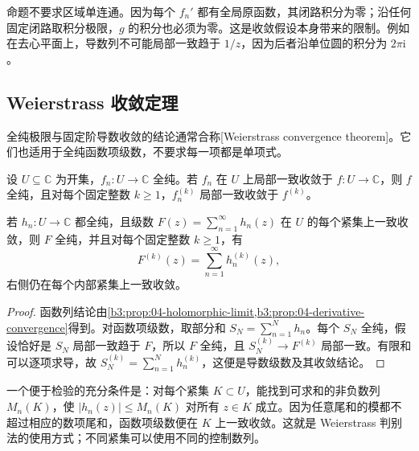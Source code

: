 \ProseParagraphBreak

命题不要求区域单连通。因为每个 \(f_n'\) 都有全局原函数，其闭路积分为零；沿任何固定闭路取积分极限，\(g\) 的积分也必须为零。这是收敛假设本身带来的限制。例如在去心平面上，导数列不可能局部一致趋于 \(1/z\)，因为后者沿单位圆的积分为 \(2\pi\mathrm{i}\)。

\subsection{Weierstrass 收敛定理}
\label{b3:subsec:040104}

全纯极限与固定阶导数收敛的结论通常合称[Weierstrass convergence theorem]。它们也适用于全纯函数项级数，不要求每一项都是单项式。
\begin{theorem}[Weierstrass]\label{b3:thm:04-weierstrass}
设 \(U\subseteq\mathbb C\) 为开集，\(f_n:U\to\mathbb C\) 全纯。若 \(f_n\) 在 \(U\) 上局部一致收敛于 \(f:U\to\mathbb C\)，则 \(f\) 全纯，且对每个固定整数 \(k\ge1\)，\(f_n^{(k)}\) 局部一致收敛于 \(f^{(k)}\)。

若 \(h_n:U\to\mathbb C\) 都全纯，且级数 \(F(z)=\sum_{n=1}^\infty h_n(z)\) 在 \(U\) 的每个紧集上一致收敛，则 \(F\) 全纯，并且对每个固定整数 \(k\ge1\)，有
\[
 F^{(k)}(z)=\sum_{n=1}^\infty h_n^{(k)}(z),
\]
右侧仍在每个内部紧集上一致收敛。
\end{theorem}
\begin{proof}
函数列结论由\cref{b3:prop:04-holomorphic-limit,b3:prop:04-derivative-convergence}得到。对函数项级数，取部分和 \(S_N=\sum_{n=1}^Nh_n\)。每个 \(S_N\) 全纯，假设恰好是 \(S_N\) 局部一致趋于 \(F\)，所以 \(F\) 全纯，且 \(S_N^{(k)}\to F^{(k)}\) 局部一致。有限和可以逐项求导，故 \(S_N^{(k)}=\sum_{n=1}^Nh_n^{(k)}\)，这便是导数级数及其收敛结论。
\end{proof}

一个便于检验的充分条件是：对每个紧集 \(K\subset U\)，能找到可求和的非负数列 \(M_n(K)\)，使 \(|h_n(z)|\le M_n(K)\) 对所有 \(z\in K\) 成立。因为任意尾和的模都不超过相应的数项尾和，函数项级数便在 \(K\) 上一致收敛。这就是 Weierstrass 判别法的使用方式；不同紧集可以使用不同的控制数列。

\ProseParagraphBreak

